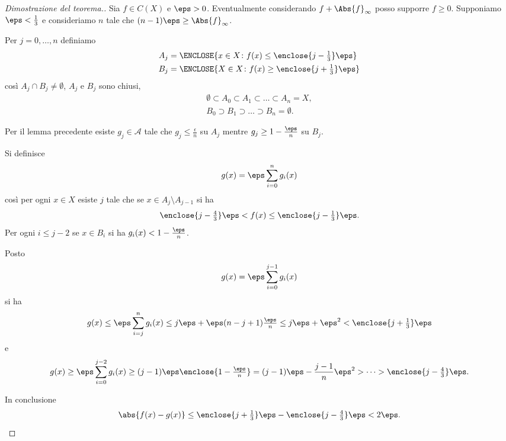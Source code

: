 \begin{proof}[Dimostrazione del teorema.]

Sia $f\in C(X)$ e $\eps>0$.
Eventualmente considerando $f+ \Abs{f}_\infty$ posso 
supporre $f\ge 0$.
Supponiamo $\eps < \frac 1 3$ 
e consideriamo $n$ tale che $(n-1)\eps \ge \Abs{f}_\infty$.

Per $j=0, \dots, n$ definiamo 
\begin{align*}
    A_j &= \ENCLOSE{x\in X\colon f(x) \le \enclose{j-\tfrac 1 3}\eps}\\
    B_j &= \ENCLOSE{X\in X\colon f(x) \ge \enclose{j+\tfrac 1 3}\eps}
\end{align*}
così $A_j\cap B_j\neq \emptyset$, $A_j$ e $B_j$ sono chiusi,
\begin{gather*}
    \emptyset \subset A_0 \subset A_1 \subset \dots \subset A_n = X, \\
    B_0 \supset B_1 \supset \dots \supset B_n = \emptyset.
\end{gather*}


Per il lemma precedente esiste
$g_j\in{\mathcal A}$ tale che
$g_j \le \frac \epsilon n$
su $A_j$ 
mentre $g_j \ge 1 - \tfrac \eps n$ su $B_j$.

Si definisce
\[
g(x)=\eps\sum_{i=0}^n g_i(x)
\]
così per ogni $x\in X$ esiste $j$ 
tale che se $x\in A_j \setminus A_{j-1}$
si ha 
\[
 \enclose{j - \tfrac 4 3} \eps 
 < f(x) 
 \le \enclose{j - \tfrac 1 3} \eps.
\]
Per ogni $i\le j-2$ se $x\in B_i$ 
si ha $g_i(x) < 1 - \tfrac \eps n$.

Posto
\[
g(x) = \eps \sum_{i=0}^{j-1} g_i(x)
\]
si ha  
\[
g(x)\le \eps \sum_{i=j}^{n} g_i(x)
\le j\eps + \eps (n-j+1)\tfrac \eps n
\le j\eps + \eps^2 
< \enclose{j+\tfrac 1 3}\eps
\]
e
\[
g(x) 
\ge \eps \sum_{i=0}^{j-2} g_i(x) 
\ge (j-1) \eps \enclose{1-\tfrac \eps n}
= (j-1)\eps - \frac{j-1}{n}\eps^2 
> \dots > \enclose{j-\tfrac 4 3} \eps.
\]

In conclusione 
\[
  \abs{f(x) - g(x)} 
  \le \enclose{j+\tfrac 1 3} \eps - \enclose{j-\tfrac 4 3} \eps 
  < 2 \eps.
\]
\end{proof}